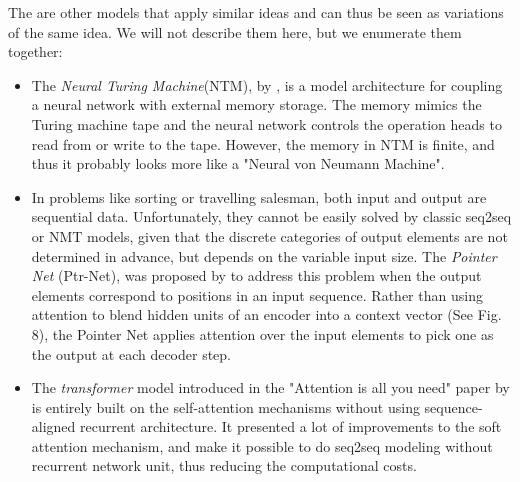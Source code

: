 The are other models that apply similar ideas and can thus be seen as variations of the same idea. We will not describe them here, but we enumerate them together:

\begin{itemize}
    \item The \textit{Neural Turing Machine}(NTM), by \citet{Graves2014}, is a model architecture for coupling a neural network with external memory storage. The memory mimics the Turing machine tape and the neural network controls the operation heads to read from or write to the tape. However, the memory in NTM is finite, and thus it probably looks more like a "Neural von Neumann Machine".
    \item In problems like sorting or travelling salesman, both input and output are sequential data. Unfortunately, they cannot be easily solved by classic seq2seq or NMT models, given that the discrete categories of output elements are not determined in advance, but depends on the variable input size. The \textit{Pointer Net} (Ptr-Net), was proposed by \citet{Vinyals2015} to address this problem when the output elements correspond to positions in an input sequence. Rather than using attention to blend hidden units of an encoder into a context vector (See Fig. 8), the Pointer Net applies attention over the input elements to pick one as the output at each decoder step.
    \item The \textit{transformer} model introduced in the "Attention is all you need" paper by \citet{Vaswani2017} is entirely built on the self-attention mechanisms without using sequence-aligned recurrent architecture. It presented a lot of improvements to the soft attention mechanism, and make it possible to do seq2seq modeling without recurrent network unit, thus reducing the computational costs.
\end{itemize}



